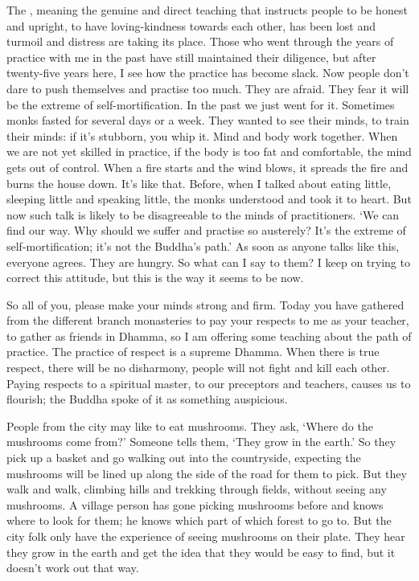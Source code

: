 The , meaning the genuine and direct teaching that instructs people to be honest and upright, to have loving-kindness towards each other, has been lost and turmoil and distress are taking its place. Those who went through the years of practice with me in the past have still maintained their diligence, but after twenty-five years here, I see how the practice has become slack. Now people don't dare to push themselves and practise too much. They are afraid. They fear it will be the extreme of self-mortification. In the past we just went for it. Sometimes monks fasted for several days or a week. They wanted to see their minds, to train their minds: if it's stubborn, you whip it. Mind and body work together. When we are not yet skilled in practice, if the body is too fat and comfortable, the mind gets out of control. When a fire starts and the wind blows, it spreads the fire and burns the house down. It's like that. Before, when I talked about eating little, sleeping little and speaking little, the monks understood and took it to heart. But now such talk is likely to be disagreeable to the minds of practitioners. `We can find our way. Why should we suffer and practise so austerely? It's the extreme of self-mortification; it's not the Buddha's path.' As soon as anyone talks like this, everyone agrees. They are hungry. So what can I say to them? I keep on trying to correct this attitude, but this is the way it seems to be now.

So all of you, please make your minds strong and firm. Today you have gathered from the different branch monasteries to pay your respects to me as your teacher, to gather as friends in Dhamma, so I am offering some teaching about the path of practice. The practice of respect is a supreme Dhamma. When there is true respect, there will be no disharmony, people will not fight and kill each other. Paying respects to a spiritual master, to our preceptors and teachers, causes us to flourish; the Buddha spoke of it as something auspicious.

People from the city may like to eat mushrooms. They ask, `Where do the mushrooms come from?' Someone tells them, `They grow in the earth.' So they pick up a basket and go walking out into the countryside, expecting the mushrooms will be lined up along the side of the road for them to pick. But they walk and walk, climbing hills and trekking through fields, without seeing any mushrooms. A village person has gone picking mushrooms before and knows where to look for them; he knows which part of which forest to go to. But the city folk only have the experience of seeing mushrooms on their plate. They hear they grow in the earth and get the idea that they would be easy to find, but it doesn't work out that way.

